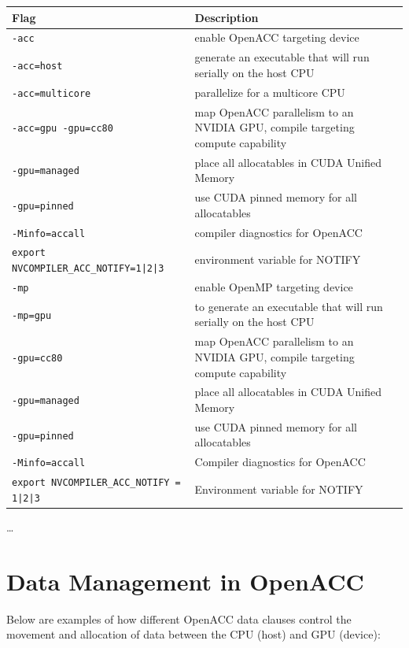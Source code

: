 \begin{center}
    \begin{tabular}{ll}
        \hline
        \textbf{Flag} & \textbf{Description}\\
    \hline
    \texttt{-acc} & enable OpenACC targeting device \\
    \texttt{-acc=host} & generate an executable that will run serially on the host CPU \\
    \texttt{-acc=multicore} & parallelize for a multicore CPU \\
    \texttt{-acc=gpu -gpu=cc80} & map OpenACC parallelism to an NVIDIA GPU, compile targeting compute capability \\
    \texttt{-gpu=managed} & place all allocatables in CUDA Unified Memory \\
    \texttt{-gpu=pinned} & use CUDA pinned memory for all allocatables \\
    \texttt{-Minfo=accall} & compiler diagnostics for OpenACC \\
    \texttt{export NVCOMPILER\_ACC\_NOTIFY=1|2|3} & environment variable for NOTIFY \\
    \hline
    \texttt{-mp} & enable OpenMP targeting device \\
    \texttt{-mp=gpu} & to generate an executable that will run serially on the host CPU \\
    \texttt{-gpu=cc80} & map OpenACC parallelism to an NVIDIA GPU, compile targeting compute capability \\
    \texttt{-gpu=managed} & place all allocatables in CUDA Unified Memory \\
    \texttt{-gpu=pinned} & use CUDA pinned memory for all allocatables \\
    \texttt{-Minfo=accall} & Compiler diagnostics for OpenACC \\
    \texttt{export NVCOMPILER\_ACC\_NOTIFY = 1|2|3} & Environment variable for NOTIFY \\
    \hline
\end{tabular}
\end{center}

\dots

\newpage

\section{Data Management in OpenACC}

Below are examples of how different OpenACC data clauses control the movement and allocation of data between the CPU (host) and GPU (device):

